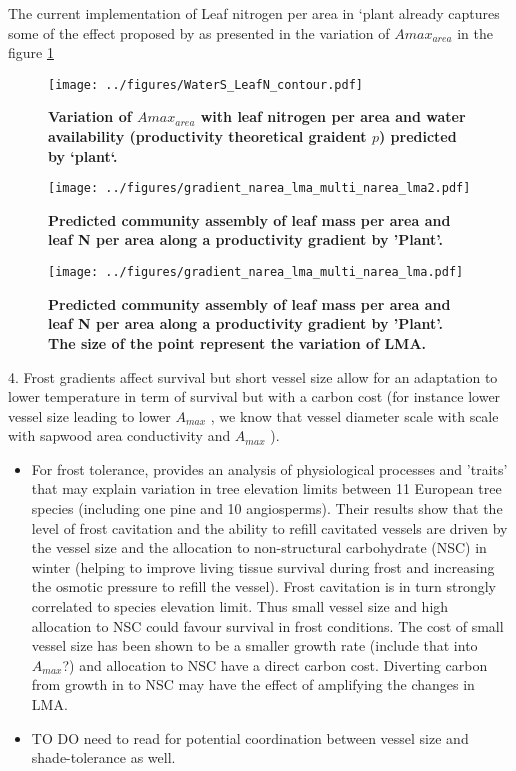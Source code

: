 \documentclass[a4paper,11pt]{article}
\begin{document}
The current implementation of Leaf nitrogen per area in `plant already captures some of the effect proposed by \citet{Wright-2003} as presented in the variation of $A{max}_{area}$ in the figure \ref{fig:leafN_water}

\begin{figure}[ht]
\centering
\texttt{[image: ../figures/WaterS\_LeafN\_contour.pdf]}
\caption{\textbf{Variation of $A{max}_{area}$ with leaf nitrogen per area and water availability (productivity theoretical graident $p$) predicted by `plant`.}
\label{fig:leafN_water}}
\end{figure}


\begin{figure}[ht]
\centering
\texttt{[image: ../figures/gradient\_narea\_lma\_multi\_narea\_lma2.pdf]}
\caption{\textbf{Predicted community assembly of leaf mass per area and leaf N per area along a productivity gradient by 'Plant'.}
\label{fig:lma_mat_o_map}}
\end{figure}

\begin{figure}[ht]
\centering
\texttt{[image: ../figures/gradient\_narea\_lma\_multi\_narea\_lma.pdf]}
\caption{\textbf{Predicted community assembly of leaf mass per area and leaf N per area along a productivity gradient by 'Plant'. The size of the point represent the variation of LMA.}
\label{fig:lma_mat_o_map}}
\end{figure}

\clearpage

4. Frost gradients affect survival but
short vessel size allow for an adaptation to lower temperature in term
of survival but
with a carbon cost (for instance lower vessel size leading to lower
$A_{max}$ \citep{Poorter-2010}, we know that vessel diameter scale with scale with sapwood area conductivity and $A_{max}$ \citep{Chen-2009,Choat-2011}).


\begin{itemize}
\item  For frost tolerance, \citet{Charrier-2013} provides an analysis of physiological processes and 'traits' that may explain variation in tree elevation limits between 11 European tree species (including one pine and 10 angiosperms). Their results show that the level of frost cavitation and the ability to refill cavitated vessels are driven by the vessel size and the allocation to non-structural carbohydrate (NSC) in winter (helping to improve living tissue survival during frost and increasing the osmotic pressure to refill the vessel). Frost cavitation is in turn strongly correlated to species elevation limit. Thus small vessel size and high allocation to NSC could favour survival in frost conditions. The cost of small vessel size has been shown to be a smaller growth rate \citep{Poorter-2010} (include that into $A_{max}$?) and allocation to NSC have a direct carbon cost. Diverting carbon from growth in to NSC may have the effect of amplifying the changes in LMA.
\item TO DO need to read \citet{Markesteijn-2011} for potential coordination between vessel size and shade-tolerance as well.
\end{itemize}
\end{document}
